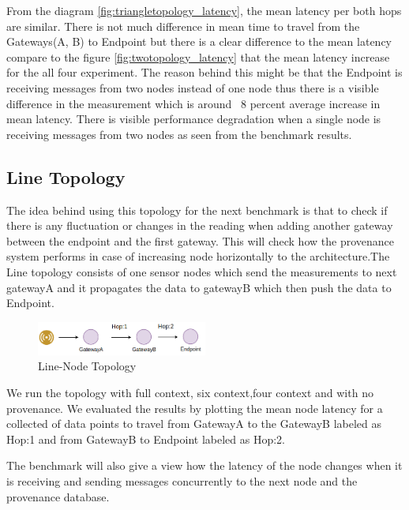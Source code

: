 From the diagram \ref{fig:triangletopology_latency}, the mean latency per both hops are similar. There is not much difference in mean time to travel from the Gateways(A, B) to Endpoint but there is a clear difference to the mean latency compare to the figure \ref{fig:twotopology_latency} that the mean latency increase for the all four experiment. The reason behind this might be that the Endpoint is receiving messages from two nodes instead of one node thus there is a visible difference in the measurement which is around ~8 percent average increase in mean latency. There is visible performance degradation when a single node is receiving messages from two nodes as seen from the benchmark results.

\subsection{Line Topology}
The idea behind using this topology for the next benchmark is that to check if there is any fluctuation or changes in the reading when adding another gateway between the endpoint and the first gateway. This will check how the provenance system performs in case of increasing node horizontally to the architecture.The Line topology consists of one sensor nodes which send the measurements to next gatewayA and it propagates the data to gatewayB which then push the data to Endpoint. 

\begin{figure}[H]
	\center
	\includegraphics[width=0.5\textwidth]{figures/latencytopo_line.png}
	\caption{Line-Node Topology}
	\label{fig:line_topo}
\end{figure}

We run the topology with full context, six context,four context and with no provenance. We evaluated the results by plotting the mean node latency for a collected of data points
to travel from GatewayA to the GatewayB labeled as Hop:1  and from GatewayB to Endpoint labeled as Hop:2.

The benchmark will also give a view how the latency of the node changes when it is receiving and sending messages concurrently to the next node and the provenance database.


